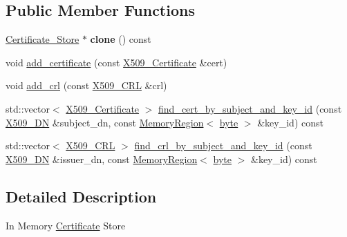 \subsection*{Public Member Functions}
\begin{DoxyCompactItemize}
\item 
\hypertarget{classBotan_1_1Certificate__Store__Memory_a242df980c0edd7fefbbdbc46f144fc51}{\hyperlink{classBotan_1_1Certificate__Store}{Certificate\-\_\-\-Store} $\ast$ {\bfseries clone} () const }\label{classBotan_1_1Certificate__Store__Memory_a242df980c0edd7fefbbdbc46f144fc51}

\item 
void \hyperlink{classBotan_1_1Certificate__Store__Memory_a9649cceaeb63395b36cc9be6271b3ff0}{add\-\_\-certificate} (const \hyperlink{classBotan_1_1X509__Certificate}{X509\-\_\-\-Certificate} \&cert)
\item 
void \hyperlink{classBotan_1_1Certificate__Store__Memory_abc5524c81717c2d80a4b23a4ade90e1d}{add\-\_\-crl} (const \hyperlink{classBotan_1_1X509__CRL}{X509\-\_\-\-C\-R\-L} \&crl)
\item 
std\-::vector$<$ \hyperlink{classBotan_1_1X509__Certificate}{X509\-\_\-\-Certificate} $>$ \hyperlink{classBotan_1_1Certificate__Store__Memory_a5f0985baf9165c0ce584c18da29e1a08}{find\-\_\-cert\-\_\-by\-\_\-subject\-\_\-and\-\_\-key\-\_\-id} (const \hyperlink{classBotan_1_1X509__DN}{X509\-\_\-\-D\-N} \&subject\-\_\-dn, const \hyperlink{classBotan_1_1MemoryRegion}{Memory\-Region}$<$ \hyperlink{namespaceBotan_a7d793989d801281df48c6b19616b8b84}{byte} $>$ \&key\-\_\-id) const 
\item 
std\-::vector$<$ \hyperlink{classBotan_1_1X509__CRL}{X509\-\_\-\-C\-R\-L} $>$ \hyperlink{classBotan_1_1Certificate__Store__Memory_ac4956a93d19b5cfd7e297cdd90c4ac36}{find\-\_\-crl\-\_\-by\-\_\-subject\-\_\-and\-\_\-key\-\_\-id} (const \hyperlink{classBotan_1_1X509__DN}{X509\-\_\-\-D\-N} \&issuer\-\_\-dn, const \hyperlink{classBotan_1_1MemoryRegion}{Memory\-Region}$<$ \hyperlink{namespaceBotan_a7d793989d801281df48c6b19616b8b84}{byte} $>$ \&key\-\_\-id) const 
\end{DoxyCompactItemize}


\subsection{Detailed Description}
In Memory \hyperlink{classBotan_1_1Certificate}{Certificate} Store 

